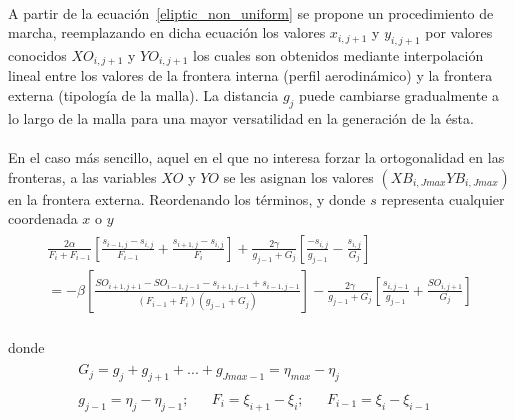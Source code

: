 \documentclass[letterpaper, openright, 12pt]{book}
\begin{document}
    \paragraph*{}
    A partir de la ecuación~\ref{eliptic_non_uniform} se propone un
    procedimiento de marcha, reemplazando en dicha ecuación los valores
    $x_{i, j + 1}$ y $y_{i, j+1}$ por valores conocidos $XO_{i, j + 1}$ y
    $YO_{i, j + 1}$ los cuales son obtenidos mediante interpolación lineal
    entre los valores de la frontera interna (perfil aerodinámico) y la
    frontera externa (tipología de la malla). La distancia $g_j$ puede
    cambiarse gradualmente a lo largo de la malla para una mayor
    versatilidad en la generación de la ésta.

    \paragraph*{}
    En el caso más sencillo, aquel en el que no interesa forzar la
    ortogonalidad en las fronteras, a las variables $XO$ y $YO$ se les
    asignan los valores $(XB_{i, Jmax} YB_{i, Jmax})$ en la frontera
    externa. Reordenando los términos, y donde $s$ representa cualquier
    coordenada $x$ o $y$\\
    \begin{align}
        \begin{aligned}
            \frac{2\alpha}{F_i + F_{i - 1}} \left[ \frac{s_{i-1, j} - s_{i, j}}{F_{i - 1}} + \frac{s_{i+1, j} - s_{i, j}}{F_i} \right] + \frac{2\gamma}{g_{j - 1} + G_j} \left[ \frac{-s_{i, j}}{g_{j - 1}} - \frac{s_{i, j}}{G_j} \right]\\
            = -\beta \left[ \frac{ SO_{i+1, j+1} - SO_{i-1, j-1} - s_{i+1, j-1} + s_{i-1, j-1} }{ (F_{i - 1} + F_i) (g_{j - 1} + G_j) } \right] - \frac{2\gamma}{g_{j-1} + G_j} \left[ \frac{s_{i, j - 1}}{g_{j - 1}} + \frac{SO_{i, j + 1}}{G_j} \right]
        \end{aligned}
        \label{eliptic_non_uniform1}
    \end{align}\\

    donde
    \begin{align*}
        &\begin{aligned}
        G_j = g_j + g_{j + 1} + ... + g_{Jmax - 1} = \eta_{max} - \eta_j
        \end{aligned}\\
        &\begin{aligned}
        g_{j - 1} = \eta_j - \eta_{j - 1};&& F_i = \xi_{i + 1} - \xi_i; && F_{i - 1} = \xi_i - \xi_{i - 1}&&
        \end{aligned}
    \end{align*}\\
\end{document}
